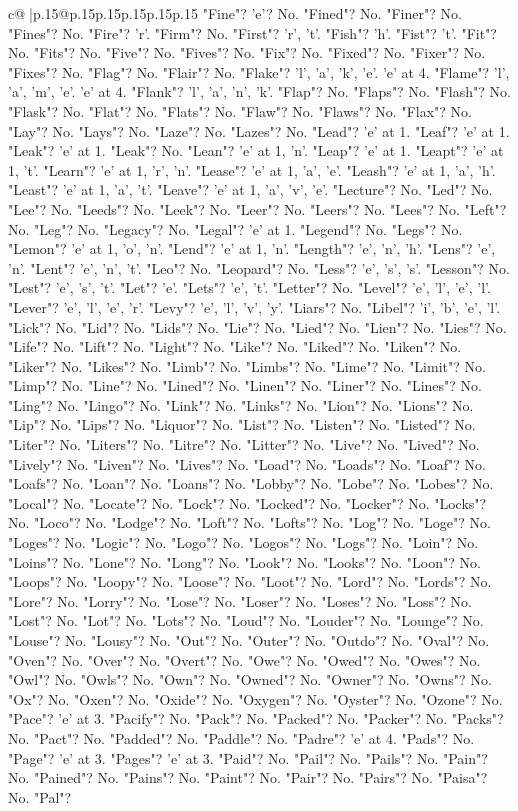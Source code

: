 \documentclass{article}
\begin{document}
{\begin{supertabular}{c@{$\;$}|p{.15\linewidth}@{}p{.15\linewidth}p{.15\linewidth}p{.15\linewidth}p{.15\linewidth}p{.15\linewidth}}
{{{"Fine"? 'e'? No. "Fined"? No. "Finer"? No. "Fines"? No. "Fire"? 'r'. "Firm"? No. "First"? 'r', 't'. "Fish"? 'h'. "Fist"? 't'. "Fit"? No. "Fits"? No. "Five"? No. "Fives"? No. "Fix"? No. "Fixed"? No. "Fixer"? No. "Fixes"? No. "Flag"? No. "Flair"? No. "Flake"? 'l', 'a', 'k', 'e'. 'e' at 4. "Flame"? 'l', 'a', 'm', 'e'. 'e' at 4. "Flank"? 'l', 'a', 'n', 'k'. "Flap"? No. "Flaps"? No. "Flash"? No. "Flask"? No. "Flat"? No. "Flats"? No. "Flaw"? No. "Flaws"? No. "Flax"? No. "Lay"? No. "Lays"? No. "Laze"? No. "Lazes"? No. "Lead"? 'e' at 1. "Leaf"? 'e' at 1. "Leak"? 'e' at 1. "Leak"? No. "Lean"? 'e' at 1, 'n'. "Leap"? 'e' at 1. "Leapt"? 'e' at 1, 't'. "Learn"? 'e' at 1, 'r', 'n'. "Lease"? 'e' at 1, 'a', 'e'. "Leash"? 'e' at 1, 'a', 'h'. "Least"? 'e' at 1, 'a', 't'. "Leave"? 'e' at 1, 'a', 'v', 'e'. "Lecture"? No. "Led"? No. "Lee"? No. "Leeds"? No. "Leek"? No. "Leer"? No. "Leers"? No. "Lees"? No. "Left"? No. "Leg"? No. "Legacy"? No. "Legal"? 'e' at 1. "Legend"? No. "Legs"? No. "Lemon"? 'e' at 1, 'o', 'n'. "Lend"? 'e' at 1, 'n'. "Length"? 'e', 'n', 'h'. "Lens"? 'e', 'n'. "Lent"? 'e', 'n', 't'. "Leo"? No. "Leopard"? No. "Less"? 'e', 's', 's'. "Lesson"? No. "Lest"? 'e', 's', 't'. "Let"? 'e'. "Lets"? 'e', 't'. "Letter"? No. "Level"? 'e', 'l', 'e', 'l'. "Lever"? 'e', 'l', 'e', 'r'. "Levy"? 'e', 'l', 'v', 'y'. "Liars"? No. "Libel"? 'i', 'b', 'e', 'l'. "Lick"? No. "Lid"? No. "Lids"? No. "Lie"? No. "Lied"? No. "Lien"? No. "Lies"? No. "Life"? No. "Lift"? No. "Light"? No. "Like"? No. "Liked"? No. "Liken"? No. "Liker"? No. "Likes"? No. "Limb"? No. "Limbs"? No. "Lime"? No. "Limit"? No. "Limp"? No. "Line"? No. "Lined"? No. "Linen"? No. "Liner"? No. "Lines"? No. "Ling"? No. "Lingo"? No. "Link"? No. "Links"? No. "Lion"? No. "Lions"? No. "Lip"? No. "Lips"? No. "Liquor"? No. "List"? No. "Listen"? No. "Listed"? No. "Liter"? No. "Liters"? No. "Litre"? No. "Litter"? No. "Live"? No. "Lived"? No. "Lively"? No. "Liven"? No. "Lives"? No. "Load"? No. "Loads"? No. "Loaf"? No. "Loafs"? No. "Loan"? No. "Loans"? No. "Lobby"? No. "Lobe"? No. "Lobes"? No. "Local"? No. "Locate"? No. "Lock"? No. "Locked"? No. "Locker"? No. "Locks"? No. "Loco"? No. "Lodge"? No. "Loft"? No. "Lofts"? No. "Log"? No. "Loge"? No. "Loges"? No. "Logic"? No. "Logo"? No. "Logos"? No. "Logs"? No. "Loin"? No. "Loins"? No. "Lone"? No. "Long"? No. "Look"? No. "Looks"? No. "Loon"? No. "Loops"? No. "Loopy"? No. "Loose"? No. "Loot"? No. "Lord"? No. "Lords"? No. "Lore"? No. "Lorry"? No. "Lose"? No. "Loser"? No. "Loses"? No. "Loss"? No. "Lost"? No. "Lot"? No. "Lots"? No. "Loud"? No. "Louder"? No. "Lounge"? No. "Louse"? No. "Lousy"? No. "Out"? No. "Outer"? No. "Outdo"? No. "Oval"? No. "Oven"? No. "Over"? No. "Overt"? No. "Owe"? No. "Owed"? No. "Owes"? No. "Owl"? No. "Owls"? No. "Own"? No. "Owned"? No. "Owner"? No. "Owns"? No. "Ox"? No. "Oxen"? No. "Oxide"? No. "Oxygen"? No. "Oyster"? No. "Ozone"? No. "Pace"? 'e' at 3. "Pacify"? No. "Pack"? No. "Packed"? No. "Packer"? No. "Packs"? No. "Pact"? No. "Padded"? No. "Paddle"? No. "Padre"? 'e' at 4. "Pads"? No. "Page"? 'e' at 3. "Pages"? 'e' at 3. "Paid"? No. "Pail"? No. "Pails"? No. "Pain"? No. "Pained"? No. "Pains"? No. "Paint"? No. "Pair"? No. "Pairs"? No. "Paisa"? No. "Pal"? }}}
\end{supertabular}}
\end{document}
